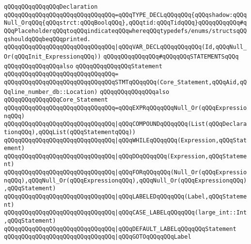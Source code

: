 \verb|qQQqqQQqqQQqqQQqDeclaration|\newline
\verb|qQQqqQQqqQQqqQQqqQQqqQQqqQQqqQQq=qQQqTYPE_DECLqQQqqQQq{qQQqshadow:qQQqNull_OrqQQq{qQQqstrct:qQQqBoolqQQq},qQQqtid:qQQqTidqQQq}qQQqqQQqqQQq#qQQqPlaceholderqQQqtoqQQqindicateqQQqwhereqQQqtypedefs/enums/structsqQQqshouldqQQqbeqQQqprinted.|\newline
\verb|qQQqqQQqqQQqqQQqqQQqqQQqqQQqqQQq|\verb#|qQQqVAR_DECLqQQqqQQqqQQq(Id,qQQqNull_Or(qQQqInit_ExpressionqQQq))#\newline
\newline
\newline
\verb|qQQqqQQqqQQqqQQq#qQQqqQQqSTATEMENTSqQQq|\newline
\newline
\verb|qQQqqQQqqQQqqQQqalso|\newline
\verb|qQQqqQQqqQQqqQQqStatement|\newline
\verb|qQQqqQQqqQQqqQQqqQQqqQQqqQQqqQQq=|\newline
\verb|qQQqqQQqqQQqqQQqqQQqqQQqqQQqqQQqSTMTqQQqqQQq(Core_Statement,qQQqAid,qQQqline_number_db::Location)|\newline
\newline
\verb|qQQqqQQqqQQqqQQqalso|\newline
\verb|qQQqqQQqqQQqqQQqCore_Statement|\newline
\verb|qQQqqQQqqQQqqQQqqQQqqQQqqQQqqQQq=qQQqEXPRqQQqqQQqNull_Or(qQQqExpressionqQQq)|\newline
\verb|qQQqqQQqqQQqqQQqqQQqqQQqqQQqqQQq|\verb#|qQQqCOMPOUNDqQQqqQQq(List(qQQqDeclarationqQQq),qQQqList(qQQqStatementqQQq))#\newline
\verb|qQQqqQQqqQQqqQQqqQQqqQQqqQQqqQQq|\verb#|qQQqWHILEqQQqqQQq(Expression,qQQqStatement)#\newline
\verb|qQQqqQQqqQQqqQQqqQQqqQQqqQQqqQQq|\verb#|qQQqDOqQQqqQQq(Expression,qQQqStatement)#\newline
\verb|qQQqqQQqqQQqqQQqqQQqqQQqqQQqqQQq|\verb#|qQQqFORqQQqqQQq(Null_Or(qQQqExpressionqQQq),qQQqNull_Or(qQQqExpressionqQQq),qQQqNull_Or(qQQqExpressionqQQq),qQQqStatement)#\newline
\verb|qQQqqQQqqQQqqQQqqQQqqQQqqQQqqQQq|\verb#|qQQqLABELEDqQQqqQQq(Label,qQQqStatement)#\newline
\verb|qQQqqQQqqQQqqQQqqQQqqQQqqQQqqQQq|\verb#|qQQqCASE_LABELqQQqqQQq(large_int::Int,qQQqStatement)#\newline
\verb|qQQqqQQqqQQqqQQqqQQqqQQqqQQqqQQq|\verb#|qQQqDEFAULT_LABELqQQqqQQqStatement#\newline
\verb|qQQqqQQqqQQqqQQqqQQqqQQqqQQqqQQq|\verb#|qQQqGOTOqQQqqQQqLabel#\newline
